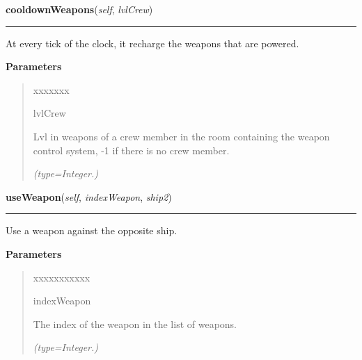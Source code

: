 \hspace{.8\funcindent}\begin{boxedminipage}{\funcwidth}

    \raggedright \textbf{cooldownWeapons}(\textit{self}, \textit{lvlCrew})

    \vspace{-1.5ex}

    \rule{\textwidth}{0.5\fboxrule}
\setlength{\parskip}{2ex}
    At every tick of the clock, it recharge the weapons that are powered.

\setlength{\parskip}{1ex}
      \textbf{Parameters}
      \vspace{-1ex}

      \begin{quote}
        \begin{Ventry}{xxxxxxx}

          \item[lvlCrew]

          Lvl in weapons of a crew member in the room containing the weapon
          control system, -1 if there is no crew member.

            {\it (type=Integer.)}

        \end{Ventry}

      \end{quote}

    \end{boxedminipage}

    \label{systems:WeaponControl:useWeapon}

    \vspace{0.5ex}

\hspace{.8\funcindent}\begin{boxedminipage}{\funcwidth}

    \raggedright \textbf{useWeapon}(\textit{self}, \textit{indexWeapon}, \textit{ship2})

    \vspace{-1.5ex}

    \rule{\textwidth}{0.5\fboxrule}
\setlength{\parskip}{2ex}
    Use a weapon against the opposite ship.

\setlength{\parskip}{1ex}
      \textbf{Parameters}
      \vspace{-1ex}

      \begin{quote}
        \begin{Ventry}{xxxxxxxxxxx}

          \item[indexWeapon]

          The index of the weapon in the list of weapons.

            {\it (type=Integer.)}

        \end{Ventry}

      \end{quote}

    \end{boxedminipage}


